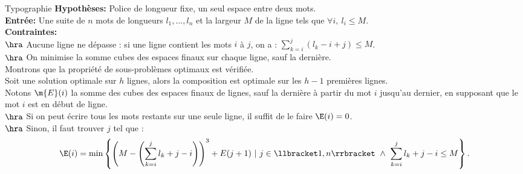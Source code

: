 \documentclass[french, 11pt]{article}
\begin{document}
\begin{ex}{Typographie}{}
    \textbf{Hypothèses:} Police de longueur fixe, un seul espace entre deux mots.\\
    \textbf{Entrée:} Une suite de $n$ mots de longueurs $l_1,...,l_n$ et la largeur $M$ de la ligne tels que $\forall i, ~ l_i \leq M$.\\
    \textbf{Contraintes:}\\
    $\hra$ Aucune ligne ne dépasse : si une ligne contient les mots $i$ à $j$, on a : $\sum_{k=i}^j\left(l_k - i + j\right) \leq M$.\\
    $\hra$ On minimise la somme cubes des espaces finaux sur chaque ligne, sauf la dernière.\\
    Montrons que la propriété de sous-problèmes optimaux est vérifiée.\\
    Soit une solution optimale sur $h$ lignes, alors la composition est optimale sur les $h-1$ premières lignes.\\
    Notons $\m{E}(i)$ la somme des cubes des espaces finaux de lignes, sauf la dernière à partir du mot $i$ jusqu'au dernier, en supposant que le mot $i$ est en début de ligne.\\
    $\hra$ Si on peut écrire tous les mots restants sur une seule ligne, il suffit de le faire $\E(i) = 0$.\\
    $\hra$ Sinon, il faut trouver $j$ tel que :
    \begin{equation*}
        \E(i)=\min\left\{\left(M-\left(\sum_{k=i}^jl_k+j-i\right)\right)^3+E(j+1) ~ | ~ j \in \llbracket1,n\rrbracket ~ \land ~ \sum_{k=i}^jl_k+j-i\leq M\right\}.
    \end{equation*}
\end{ex}

\fin
\end{document}
